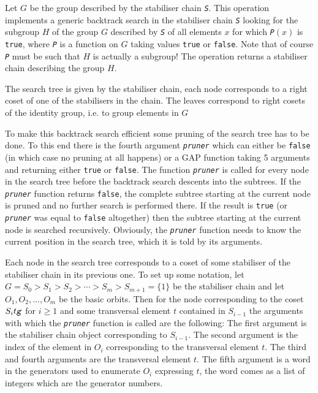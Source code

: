 \documentclass[a4paper,11pt]{report}
\begin{document}
{{{ Let $G$ be the group described by the stabiliser chain \mbox{\texttt{\mdseries\slshape S}}. This operation implements a generic backtrack search in the stabiliser chain \mbox{\texttt{\mdseries\slshape S}} looking for the subgroup $H$ of the group $G$ described by \mbox{\texttt{\mdseries\slshape S}} of all elements $x$ for which \mbox{\texttt{\mdseries\slshape P}}$(x)$ is \texttt{true}, where \mbox{\texttt{\mdseries\slshape P}} is a function on $G$ taking values \texttt{true} or \texttt{false}. Note that of course \mbox{\texttt{\mdseries\slshape P}} must be such that $H$ is actually a subgroup! The operation returns a stabiliser chain describing
the group $H$. 

 The search tree is given by the stabiliser chain, each node corresponds to a
right coset of one of the stabilisers in the chain. The leaves correspond to
right cosets of the identity group, i.e. to group elements in $G$ 

 To make this backtrack search efficient some pruning of the search tree has to
be done. To this end there is the fourth argument \mbox{\texttt{\mdseries\slshape pruner}} which can either be \texttt{false} (in which case no pruning at all happens) or a \textsf{GAP} function taking 5 arguments and returning either \texttt{true} or \texttt{false}. The function \mbox{\texttt{\mdseries\slshape pruner}} is called for every node in the search tree before the backtrack search
descents into the subtrees. If the \mbox{\texttt{\mdseries\slshape pruner}} function returns \texttt{false}, the complete subtree starting at the current node is pruned and no further
search is performed there. If the result is \texttt{true} (or \mbox{\texttt{\mdseries\slshape pruner}} was equal to \texttt{false} altogether) then the subtree starting at the current node is searched
recursively. Obviously, the \mbox{\texttt{\mdseries\slshape pruner}} function needs to know the current position in the search tree, which it is
told by its arguments. 

 Each node in the search tree corresponds to a coset of some stabiliser of the
stabiliser chain in its previous one. To set up some notation, let $ G = S_0 > S_1 > S_2 > \cdots > S_m > S_{{m+1}} = \{1\} $ be the stabiliser chain and let $ O_1, O_2, \ldots, O_m $ be the basic orbits. Then for the node corresponding to the coset $S_i t\mbox{\texttt{\mdseries\slshape g}}$ for $i \ge 1$ and some transversal element $t$ contained in $S_{{i-1}}$ the arguments with which the \mbox{\texttt{\mdseries\slshape pruner}} function is called are the following: The first argument is the stabiliser
chain object corresponding to $S_{{i-1}}$. The second argument is the index of the element in $O_i$ corresponding to the transversal element $t$. The third and fourth arguments are the transversal element $t$. The fifth argument is a word in the generators used to enumerate $O_i$ expressing $t$, the word comes as a list of integers which are the generator numbers. }

 }

  }
\end{document}
